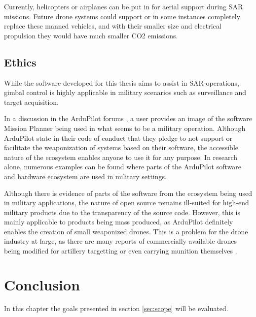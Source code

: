 \documentclass[nofilelist]{cslthse-msc}
\begin{document}
Currently, helicopters or airplanes can be put in for aerial support during SAR missions. Future drone systems could support or in some instances completely replace these manned vehicles, and with their smaller size and electrical propulsion they would have much smaller CO2 emissions.

\section{Ethics}
While the software developed for this thesis aims to assist in SAR-operations, gimbal control is highly applicable in military scenarios such as surveillance and target acquisition. 

In a discussion in the ArduPilot forums \cite{ardupilot-military-discussion}, a user provides an image of the software Mission Planner being used in what seems to be a military operation. Although ArduPilot state in their code of conduct \cite{ardupilot-coc} that they pledge to not support or facilitate the weaponization of systems based on their software, the accessible nature of the ecosystem enables anyone to use it for any purpose. In research alone, numerous examples can be found \cite{ardupilot-military} \cite{ardupilot-military-1} where parts of the ArduPilot software and hardware ecosystem are used in military settings.

Although there is evidence of parts of the software from the ecosystem being used in military applications, the nature of open source remains ill-suited for high-end military products due to the transparency of the source code. However, this is mainly applicable to products being mass produced, as ArduPilot definitely enables the creation of small weaponized drones. This is a problem for the drone industry at large, as there are many reports of commercially available drones being modified for artillery targetting or even carrying munition themselves \cite{drones-ukraine}. 

\chapter{Conclusion}
In this chapter the goals presented in section \ref{sec:scope} will be evaluated.
\end{document}
